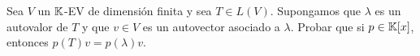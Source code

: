 \item Sea $V$ un $\mathbb{K}$-EV de dimensión finita y sea $T\in L(V)$. Supongamos que $\lambda$ es un autovalor de $T$ y que $v\in V$ es un autovector asociado a $\lambda$. Probar que si $p\in\mathbb{K}[x]$, entonces $p(T)v=p(\lambda)v$.
    \begin{mdframed}[style=s]
        
    \end{mdframed}